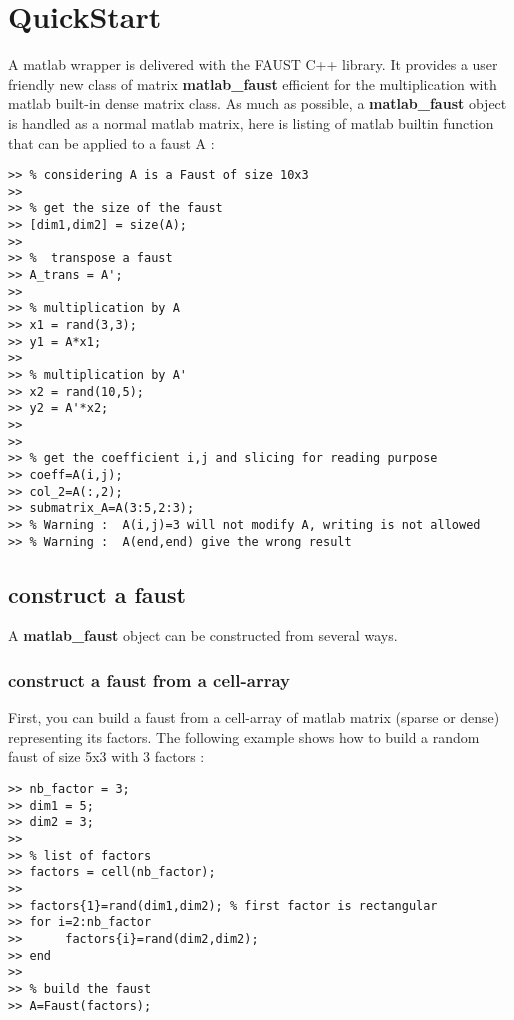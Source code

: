 \section{QuickStart}\label{sec:firstUse}


A matlab wrapper is delivered with the FAUST C++ library.
It provides a user friendly new class of matrix \textbf{matlab{\_}faust} efficient for the multiplication with matlab built-in dense matrix class.\newline
\newline
As much as possible, a \textbf{matlab{\_}faust} object is handled as a normal matlab matrix, here is listing of matlab builtin function that can be applied to a faust A :



\begin{lstlisting}
>> % considering A is a Faust of size 10x3
>>
>> % get the size of the faust
>> [dim1,dim2] = size(A);
>>
>> %  transpose a faust  
>> A_trans = A'; 		 
>> 
>> % multiplication by A
>> x1 = rand(3,3);
>> y1 = A*x1;  
>> 
>> % multiplication by A'
>> x2 = rand(10,5);
>> y2 = A'*x2;
>>
>>
>> % get the coefficient i,j and slicing for reading purpose
>> coeff=A(i,j);
>> col_2=A(:,2);
>> submatrix_A=A(3:5,2:3);
>> % Warning :  A(i,j)=3 will not modify A, writing is not allowed
>> % Warning :  A(end,end) give the wrong result   
\end{lstlisting}



\subsection{construct a faust}\label{sec:firstUseBuild}

A \textbf{matlab{\_}faust} object can be constructed from several ways.
\subsubsection{construct a faust from a cell-array}\label{sec:firstUseBuildFromCellArray}
First, you can build a faust from a cell-array of matlab matrix (sparse or dense) representing its factors.
\newline
\newline
The following example shows how to build a random faust of size 5x3 with 3 factors :
\begin{lstlisting}
>> nb_factor = 3;
>> dim1 = 5;
>> dim2 = 3; 
>>
>> % list of factors
>> factors = cell(nb_factor);
>>
>> factors{1}=rand(dim1,dim2); % first factor is rectangular 
>> for i=2:nb_factor
>> 		factors{i}=rand(dim2,dim2);
>> end
>>
>> % build the faust
>> A=Faust(factors);
\end{lstlisting}
\newpage

